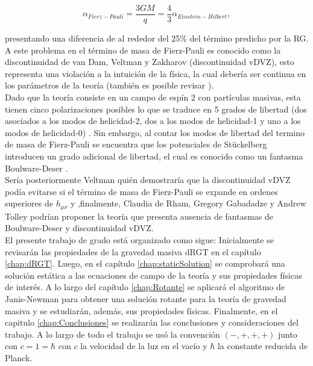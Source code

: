 \begin{equation}
    \alpha_{Fierz-Pauli}=\dfrac{3GM}{q}=\dfrac{4}{3}\alpha_{Einstein-Hilbert},
\end{equation}

presentando una diferencia de al rededor del 25\% del término predicho por la RG. A este problema en el término de masa de  Fierz-Pauli es conocido como la discontinuidad de van Dam, Veltman y Zakharov (discontinuidad vDVZ), esto representa una violación a la intuición de la física, la cual debería ser continua en los parámetros de la teoría \cite{TheoreticalAspectsOfMassiveGRavity} (también es posible revisar \cite{VanDamAndVeltmanDiscontinuity,ZakharovDiscontinuity}).\\

Dado que la teoría consiste en un campo de espín 2 con partículas masivas, esta tienen cinco polarizaciones posibles lo que se traduce en 5 grados de libertad (dos asociados a los modos de helicidad-2, dos a los modos de helicidad-1 y uno a los modos de helicidad-0) \cite{Helicity}. Sin embargo, al contar los modos de libertad del termino de masa de Fierz-Pauli se encuentra que los potenciales de St\"{u}ckelberg introducen un grado adicional de libertad, el cual es conocido como un fantasma Boulware-Deser \cite{MassiveGravity, Helicity, ExorcisingTheGhost}.\\

Sería posteriormente Veltman quién demostraría que la discontinuidad vDVZ podía evitarse si el término de masa de Fierz-Pauli se expande en ordenes superiores de $h_{\mu\nu}$ y ,finalmente, Claudia de Rham, Gregory Gabadadze y Andrew Tolley podrían proponer la teoría que presenta ausencia de fantasmas de Boulware-Deser y discontinuidad vDVZ\cite{ResummationOfMG,GeneralizationOfFP}.\\ 

El presente trabajo de grado está organizado como sigue: Inicialmente se revisarán las propiedades de la gravedad masiva dRGT en el capítulo \ref{chap:dRGT}. Luego, en el capítulo \ref{chap:staticSolution} se comprobará una solución estática a las ecuaciones de campo de la teoría y sus propiedades físicas de interés. A lo largo del capítulo \ref{chap:Rotante} se aplicará el algoritmo de Janis-Newman para obtener una solución rotante para la teoría de gravedad masiva y se estudiarán, además, sus propiedades físicas. Finalmente, en el capitulo \ref{chap:Conclusiones} se realizarán las conclusiones y consideraciones del trabajo. A lo largo de todo el trabajo se usó la convención $(-,+,+,+)$ junto con $c=1=\hbar$ con $c$ la velocidad de la luz en el vacío y $\hbar$ la constante reducida de Planck.